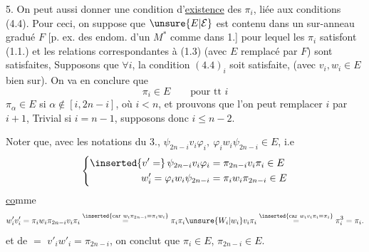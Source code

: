 
5. On peut aussi donner une condition d'\uline{existence} des $\pi_i$, liée aux conditions (4.4). Pour ceci, on suppose que $\unsure{E|\mathcal E}$ est contenu dans un sur-anneau gradué $F$ [p. ex.  des endom. d'un $M^*$ comme dans 1.] pour lequel les $\pi_i$ satisfont (1.1.) et les relations correspondantes à (1.3) (avec $E$ remplacé par $F$) sont satisfaites,  Supposons que $\forall i$, la condition $(4.4)_i$ soit satisfaite, (avec $v_i,w_i\in E$ bien sur). On va en conclure que
\[
 \pi_i\in E\qquad\text{pour tt }i
 \tag*{(5.1)}
\]
  $\pi_\alpha\in E$ si $\alpha\notin[i,2n-i]$, où $i<n$, et prouvons que l'on peut remplacer $i$ par $i+1$,  Trivial si $i=n-1$, supposons donc $i\le n-2$.

Noter que, avec les notations du 3.,      $\psi_{2n-i}v_i\varphi_i,\ \varphi_iw_i\psi_{2n-i}\in E$, i.e
\[
 \left\{\begin{aligned}
 \inserted{v' =}\,\psi_{2n-i}v_i\varphi_i&=\pi_{2n-i}v_i\pi_i\in E\\
 w'_i=\varphi_i w_i\psi_{2n-i}&=\pi_i w_i\pi_{2n-i}\in E
 \end{aligned}\right.
\]
 \uline{co}mme 
\[
 w'_iv'_i=\pi_i w_i\pi_{2n-i}v_i\pi_i
 \overset{\inserted{\text{car }w_i\pi_{2n-i}=\pi_i w_i}}{=}
 \pi_i\pi_i\unsure{W_i|w_i}v_i\pi_i
 \overset{\inserted{\text{car }w_iv_i\pi_i=\pi_i}}{=}\pi_i^3=\pi_i .
\]
et de $=$  $v'_i w'_i=\pi_{2n-i}$, on conclut que $\pi_i\in E$, $\pi_{2n-i}\in E$.
